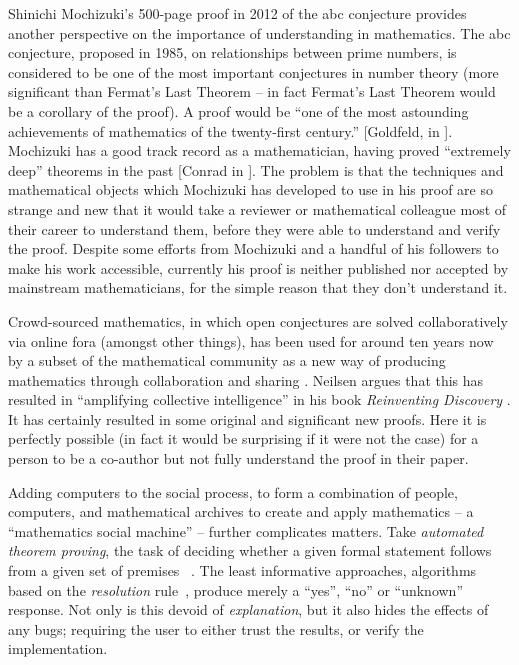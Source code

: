 \documentclass[letterpaper]{article}
\begin{document}
Shinichi Mochizuki's 500-page proof in 2012 of the abc conjecture
provides another perspective on the importance of understanding in
mathematics. The abc conjecture, proposed in 1985, on relationships
between prime numbers, is considered to be one of the most important
conjectures in number theory (more significant than Fermat’s Last
Theorem -- in fact Fermat’s Last Theorem would be a corollary of the
proof). A proof would be ``one of the most astounding achievements of
mathematics of the twenty-first century.''  [Goldfeld, in
\cite{ball:12}]. Mochizuki has a good track record as a
mathematician, having proved ``extremely deep'' theorems in the past
[Conrad in \cite{ball:12}]. The problem is that the techniques and
mathematical objects which Mochizuki has developed to use in his proof
are so strange and new that it would take a reviewer or mathematical
colleague most of their career to understand them, before they were
able to understand and verify the proof. Despite some efforts from
Mochizuki and a handful of his followers to make his work accessible,
currently his proof is neither published nor accepted by mainstream
mathematicians, for the simple reason that they don't understand
it.


Crowd-sourced mathematics, in which open conjectures are solved
collaboratively via online fora (amongst other things), has been used
for around ten years now by a subset of the mathematical community as
a new way of producing mathematics through collaboration and sharing
\cite{massively-collaborative}. Neilsen argues that this has resulted
in ``amplifying collective intelligence'' in his book {\em Reinventing
  Discovery} \cite{nielsen}. It has certainly resulted in some
original and significant new proofs. Here it is perfectly possible (in
fact it would be surprising if it were not the case) for a person to
be a co-author but not fully understand the proof in their
paper.

Adding computers to the social process, to form a combination of
people, computers, and mathematical archives to create and apply
mathematics -- a ``mathematics social machine'' \cite{martin:2013} --
further complicates matters. Take \emph{automated theorem proving}, the
task of deciding whether a given formal statement follows from a given
set of premises ~\cite{sutcliffe2001evaluating}.  The least
informative approaches, algorithms based on the \emph{resolution}
rule~\cite{robinson1965machine}, produce merely a ``yes'', ``no'' or
``unknown'' response. Not only is this devoid of \emph{explanation},
but it also hides the effects of any bugs; requiring the user to
either trust the results, or verify the implementation.
\end{document}
